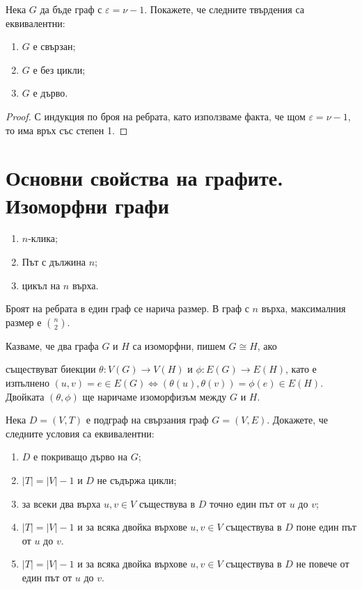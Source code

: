 \begin{problem}
  Нека $G$ да бъде граф с $\varepsilon = \nu - 1$. Покажете, че следните твърдения са еквивалентни:
  \begin{enumerate}
  \item
    $G$ е свързан;
  \item
    $G$ е без цикли;
  \item
    $G$ е дърво.
\end{enumerate}
\end{problem}
\begin{proof}
  С индукция по броя на ребрата, като използваме факта, че щом $\varepsilon = \nu - 1$, то има
  връх със степен 1.
\end{proof}



\section{Основни свойства на графите. Изоморфни графи}
\begin{dfn}
  \begin{enumerate}
  \item
    $n$-клика;
  \item
    Път с дължина $n$;
  \item
    цикъл на $n$ върха.
\end{enumerate}
\end{dfn}

Броят на ребрата в един граф се нарича размер.
В граф с $n$ върха, максималния размер е $\binom{n}{2}$.

Казваме, че два графа $G$ и $H$ са изоморфни, пишем $G\cong H$, ако
\item съществуват биекции $\theta:V(G)\to V(H)$ и $\phi:E(G)\to E(H)$, като е изпълнено
$(u,v) = e \in E(G) \iff (\theta(u),\theta(v)) = \phi(e) \in E(H)$.
Двойката $(\theta,\phi)$ ще наричаме изоморфизъм между $G$ и $H$.



\begin{problem}
  Нека $D=(V,T)$ е подграф на свързания граф $G=(V,E)$.
  Докажете, че следните условия са еквивалентни:
  \begin{enumerate}
  \item
    $D$ е покриващо дърво на $G$;
  \item
    $|T| = |V|-1$ и $D$ не съдържа цикли;
  \item
    за всеки два върха $u,v\in V$ съществува в $D$ точно един път от $u$ до $v$;
  \item
    $|T| = |V|-1$ и за всяка двойка върхове $u,v\in V$ съществува в $D$ поне един път от $u$ до $v$.
  \item
    $|T| = |V|-1$ и за всяка двойка върхове $u,v\in V$ съществува в $D$ не повече от един път от $u$ до $v$.
  \end{enumerate}
\end{problem}

